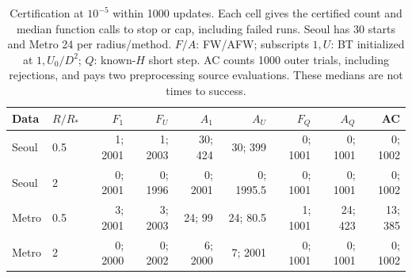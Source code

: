\begin{table}[htbp]
\centering\small
\caption{Certification at $10^{-5}$ within 1000 updates. Each cell gives the certified count and median function calls to stop or cap, including failed runs. Seoul has 30 starts and Metro 24 per radius/method. $F/A$: FW/AFW; subscripts $1,U$: BT initialized at $1,U_0/D^2$; $Q$: known-$H$ short step. AC counts 1000 outer trials, including rejections, and pays two preprocessing source evaluations. These medians are not times to success.}
\label{tab:counts}
\begin{tabular}{llrrrrrrr}
\toprule
Data & $R/R_*$ & $F_1$ & $F_U$ & $A_1$ & $A_U$ & $F_Q$ & $A_Q$ & AC \\
\midrule
Seoul & 0.5 & 1; 2001 & 1; 2003 & 30; 424 & 30; 399 & 0; 1001 & 0; 1001 & 0; 1002 \\
Seoul & 2 & 0; 2001 & 0; 1996 & 0; 2001 & 0; 1995.5 & 0; 1001 & 0; 1001 & 0; 1002 \\
Metro & 0.5 & 3; 2001 & 3; 2003 & 24; 99 & 24; 80.5 & 1; 1001 & 24; 423 & 13; 385 \\
Metro & 2 & 0; 2000 & 0; 2002 & 6; 2000 & 7; 2001 & 0; 1001 & 0; 1001 & 0; 1002 \\
\bottomrule
\end{tabular}
\end{table}

